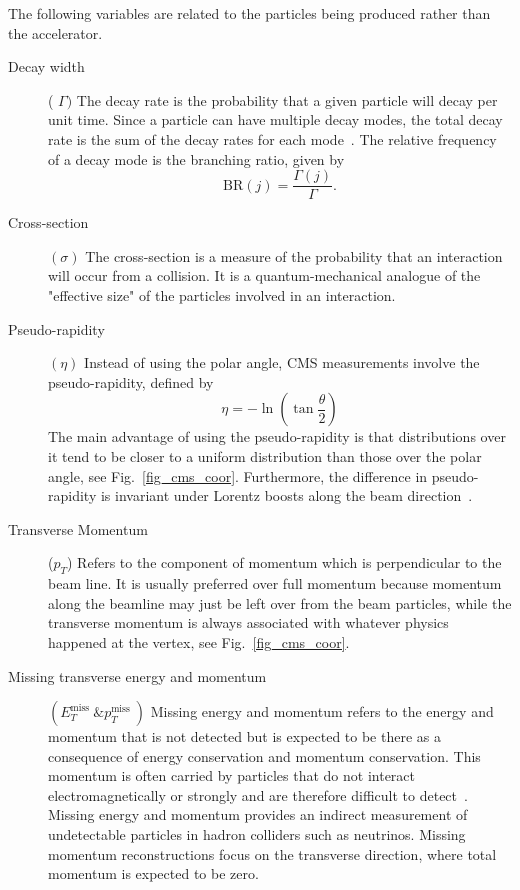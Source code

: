 The following variables are related to the particles being produced rather than the accelerator.
\begin{description}
	\item[Decay width] ( $\Gamma)$ The decay rate is the probability that a given particle will decay per unit time. Since a particle can have multiple decay modes, the total decay rate is the sum of the decay rates for each mode~\parencite{book:1123430}. The relative frequency of a decay mode is the branching ratio, given by
	$$
	\mathrm{BR}(j)=\frac{\Gamma(j)}{\Gamma} .
	$$
	\item[Cross-section] $(\sigma)$ The cross-section is a measure of the probability that an interaction will occur from a collision. It is a quantum-mechanical analogue of the "effective size" of the particles involved in an interaction.

	\item[Pseudo-rapidity] $(\eta)$ Instead of using the polar angle, CMS measurements involve the pseudo-rapidity, defined by
	$$
	\eta=-\ln \left(\tan \frac{\theta}{2}\right)
	$$
	The main advantage of using the pseudo-rapidity is that distributions over it tend to be closer to a uniform distribution than those over the polar angle, see Fig.~\ref{fig_cms_coor}. Furthermore, the difference in pseudo-rapidity is invariant under Lorentz boosts along the beam direction~\parencite{book:1123430}.
	\item[Transverse Momentum] ($p_T$) Refers to the component of momentum which is perpendicular to the beam line. It is usually preferred over full momentum because momentum along the beamline may just be left over from the beam particles, while the transverse momentum is always associated with whatever physics happened at the vertex, see Fig.~\ref{fig_cms_coor}.
	\item[Missing transverse energy and momentum] $\left(E_{T}^{\text {miss }} \& p_{T}^{\text {miss }}\right)$ Missing energy and momentum refers to the energy and momentum that is not detected but is expected to be there as a consequence of energy conservation and momentum conservation. This momentum is often carried by particles that do not interact electromagnetically or strongly and are therefore difficult to detect~\parencite{book:1123430}. Missing energy and momentum provides an indirect measurement of undetectable particles in hadron colliders such as neutrinos. Missing momentum reconstructions focus on the transverse direction, where total momentum is expected to be zero.
\end{description}

